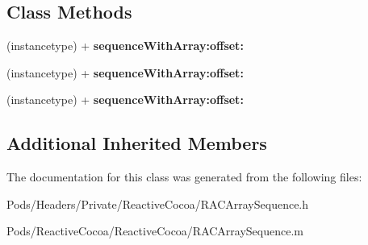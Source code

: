 \subsection*{Class Methods}
\begin{DoxyCompactItemize}
\item 
\mbox{\label{interface_r_a_c_array_sequence_a72895ac3b7ad7c426c5fd0e2feca26e7}} 
(instancetype) + {\bfseries sequence\+With\+Array\+:offset\+:}
\item 
\mbox{\label{interface_r_a_c_array_sequence_a72895ac3b7ad7c426c5fd0e2feca26e7}} 
(instancetype) + {\bfseries sequence\+With\+Array\+:offset\+:}
\item 
\mbox{\label{interface_r_a_c_array_sequence_a72895ac3b7ad7c426c5fd0e2feca26e7}} 
(instancetype) + {\bfseries sequence\+With\+Array\+:offset\+:}
\end{DoxyCompactItemize}
\subsection*{Additional Inherited Members}


The documentation for this class was generated from the following files\+:\begin{DoxyCompactItemize}
\item 
Pods/\+Headers/\+Private/\+Reactive\+Cocoa/R\+A\+C\+Array\+Sequence.\+h\item 
Pods/\+Reactive\+Cocoa/\+Reactive\+Cocoa/R\+A\+C\+Array\+Sequence.\+m\end{DoxyCompactItemize}
